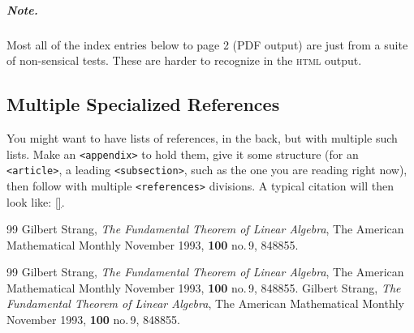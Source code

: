 \documentclass{sn-jnl}
\theoremstyle{thmstyleone}%
\theoremstyle{thmstyletwo}%
\theoremstyle{thmstylethree}%
\newcommand{\xreffont}{\relax}
\newcommand{\mono}[1]{\texttt{#1}}
\newcommand{\initialism}[1]{\textsc{\MakeLowercase{#1}}}
\numberwithin{equation}{section}
\begin{document}
\begin{appendices}
\subparagraph*{Note.}\label{appendix-index-6}%
Most all of the index entries below to page 2 (PDF output) are just from a suite of non-sensical tests.  These are harder to recognize in the \initialism{HTML} output.%
%
%
\typeout{************************************************}
\typeout{************************************************}
%
\label{appendix-multiple-references}%
%
%
\typeout{************************************************}
\typeout{************************************************}
%
\subsection{Multiple Specialized References}\label{appendix-multiple-references-2}%
You might want to have lists of references, in the back, but with multiple such lists.  Make an \mono{<appendix>} to hold them, give it some structure (for an \mono{<article>}, a leading \mono{<subsection>}, such as the one you are reading right now), then follow with multiple \mono{<references>} divisions.  A typical citation will then look like: \hyperlink{biblio-strang-article-tres}{[{\xreffont 2}]}.%
%
%
\typeout{************************************************}
\typeout{************************************************}
%

\begin{thebibliography}{99}
\hypertarget{biblio-strang-article-uno}{}Gilbert Strang, \textit{The Fundamental Theorem of Linear Algebra}, The American Mathematical Monthly November 1993, \textbf{100} no.\@\,9, 848\textendash{}855.
\end{thebibliography}
%
%
\typeout{************************************************}
\typeout{************************************************}
%

\begin{thebibliography}{99}
\hypertarget{biblio-strang-article-dos}{}Gilbert Strang, \textit{The Fundamental Theorem of Linear Algebra}, The American Mathematical Monthly November 1993, \textbf{100} no.\@\,9, 848\textendash{}855.
\hypertarget{biblio-strang-article-tres}{}Gilbert Strang, \textit{The Fundamental Theorem of Linear Algebra}, The American Mathematical Monthly November 1993, \textbf{100} no.\@\,9, 848\textendash{}855.
\end{thebibliography}
\end{appendices}%
%
\end{document}
